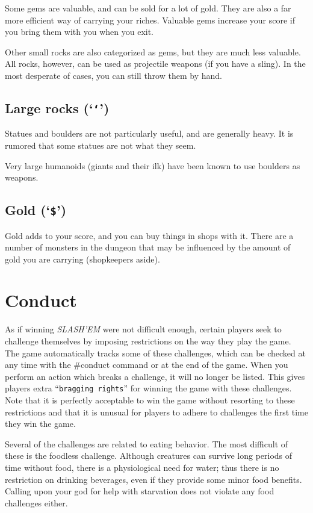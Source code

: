 
Some gems are valuable, and can be sold for a lot of gold.  They are also
a far more efficient way of carrying your riches.  Valuable gems increase
your score if you bring them with you when you exit.

Other small rocks are also categorized as gems, but they are much less
valuable.  All rocks, however, can be used as projectile weapons (if you
have a sling).  In the most desperate of cases, you can still throw them
by hand.
\subsection*{Large rocks (`{\tt `}')}


Statues and boulders are not particularly useful, and are generally
heavy.  It is rumored that some statues are not what they seem.

Very large humanoids (giants and their ilk) have been known to use boulders
as weapons.
\subsection*{Gold (`{\tt \$}')}


Gold adds to your score, and you can buy things in shops with it.
There are a number
of monsters in the dungeon that may be influenced by the amount of gold
you are carrying (shopkeepers aside).

\section{Conduct}


As if winning {\it SLASH'EM\/} were not difficult enough, certain players
seek to challenge themselves by imposing restrictions on the
way they play the game.  The game automatically tracks some of
these challenges, which can be checked at any time with the \#conduct
command or at the end of the game.  When you perform an action which
breaks a challenge, it will no longer be listed.  This gives
players extra ``{\tt bragging rights}'' for winning the game with these
challenges.  Note that it is perfectly acceptable to win the game
without resorting to these restrictions and that it is unusual for
players to adhere to challenges the first time they win the game.

Several of the challenges are related to eating behavior.  The most
difficult of these is the foodless challenge.  Although creatures
can survive long periods of time without food, there is a physiological
need for water; thus there is no restriction on drinking beverages,
even if they provide some minor food benefits.
Calling upon your god for help with starvation does
not violate any food challenges either.

